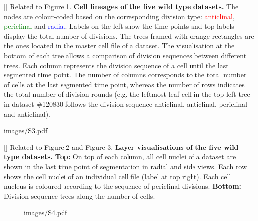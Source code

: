 []{
Related to Figure 1.
{\bf Cell lineages of the five wild type datasets.} The nodes are colour-coded based on the corresponding division type: \textcolor{red}{anticlinal}, \textcolor{green}{periclinal} and \textcolor{blue}{radial}. Labels on the left show the time points and top labels display the total number of divisions. The trees framed with orange rectangles are the ones located in the master cell file of a dataset. The visualisation at the bottom of each tree allows a comparison of division sequences between different trees. Each column represents the division sequence of a cell until the last segmented time point. The number of columns corresponds to the total number of cells at the last segmented time point, whereas the number of rows indicates the total number of division rounds (e.g. the leftmost leaf cell in the top left tree in dataset \#120830 follows the division sequence anticlinal, anticlinal, periclinal and anticlinal).
}
\label{fig:S2}
%
\clearpage
%
\begin{sidewaysfigure}
\centering
	\begin{overpic}[width=1.\linewidth]{images/S3.pdf}
	\end{overpic}
\end{sidewaysfigure}
\clearpage
{}[]{
Related to Figure 2 and Figure 3.
{\bf Layer visualisations of the five wild type datasets.} {\bf Top:} On top of each column, all cell nuclei of a dataset are shown in the last time point of segmentation in radial and side views. Each row shows the cell nuclei of an individual cell file (label at top right). Each cell nucleus is coloured according to the sequence of periclinal divisions. {\bf Bottom:} Division sequence trees along the number of cells.
}
\label{fig:S3}
%
\clearpage
%
\begin{figure}[htbp]
\centering
	\begin{overpic}[width=1.\linewidth]{images/S4.pdf}
	\end{overpic}
\end{figure}
\clearpage
